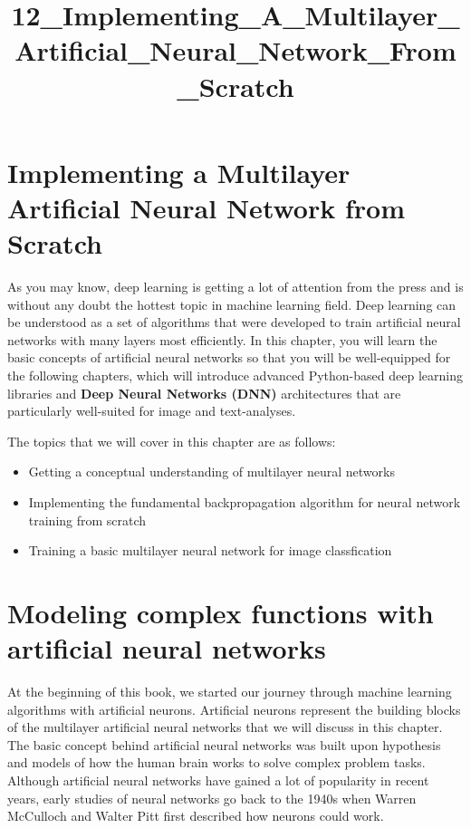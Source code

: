 \documentclass[11pt]{article}
\title{12\_Implementing\_A\_Multilayer\_Artificial\_Neural\_Network\_From\_Scratch}
\providecommand{\tightlist}{%
      \setlength{\itemsep}{0pt}\setlength{\parskip}{0pt}}
\begin{document}
    
    
    \maketitle
    
    

    
    \section{Implementing a Multilayer Artificial Neural Network from
Scratch}\label{implementing-a-multilayer-artificial-neural-network-from-scratch}

    As you may know, deep learning is getting a lot of attention from the
press and is without any doubt the hottest topic in machine learning
field. Deep learning can be understood as a set of algorithms that were
developed to train artificial neural networks with many layers most
efficiently. In this chapter, you will learn the basic concepts of
artificial neural networks so that you will be well-equipped for the
following chapters, which will introduce advanced Python-based deep
learning libraries and \textbf{Deep Neural Networks (DNN)} architectures
that are particularly well-suited for image and text-analyses.

The topics that we will cover in this chapter are as follows:

\begin{itemize}
\tightlist
\item
  Getting a conceptual understanding of multilayer neural networks
\item
  Implementing the fundamental backpropagation algorithm for neural
  network training from scratch
\item
  Training a basic multilayer neural network for image classfication
\end{itemize}

    \section{Modeling complex functions with artificial neural
networks}\label{modeling-complex-functions-with-artificial-neural-networks}

    At the beginning of this book, we started our journey through machine
learning algorithms with artificial neurons. Artificial neurons
represent the building blocks of the multilayer artificial neural
networks that we will discuss in this chapter. The basic concept behind
artificial neural networks was built upon hypothesis and models of how
the human brain works to solve complex problem tasks. Although
artificial neural networks have gained a lot of popularity in recent
years, early studies of neural networks go back to the 1940s when Warren
McCulloch and Walter Pitt first described how neurons could work.
\end{document}

